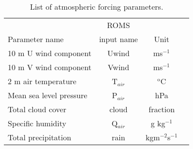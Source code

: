 \begin{table}[t]
 \begin{center}
  \caption{List of atmospheric forcing parameters.}
   \begin{tabular}{lccl}
   \hline
    					& ROMS			& 		\\
    Parameter name			& input name		& Unit		\\
   \hline
    10 m U wind component		& Uwind			& ms$^{-1}$	\\
    10 m V wind component 		& Vwind			& ms$^{-1}$	\\
    2 m air temperature			& T$_{air}$		& $^{\text{o}}$C	\\
    Mean sea level pressure		& P$_{air}$		& hPa		\\
    Total cloud cover			& cloud			& fraction		\\
    Specific humidity			& Q$_{air}$		& g kg$^{-1}$	\\
    Total precipitation			& rain			& kgm$^{-2}$s$^{-1}$		\\
   \hline
   \end{tabular}
  \label{tab:atmos_para}
 \end{center}
\end{table} 

